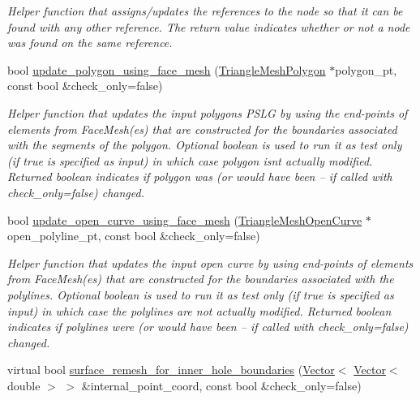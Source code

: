 \begin{DoxyCompactItemize}
\begin{DoxyCompactList}\small\item\em Helper function that assigns/updates the references to the node so that it can be found with any other reference. The return value indicates whether or not a node was found on the same reference. \end{DoxyCompactList}\item 
bool \hyperlink{classoomph_1_1RefineableTriangleMesh_ae089d459099bb928ced9b8a306b99df5}{update\+\_\+polygon\+\_\+using\+\_\+face\+\_\+mesh} (\hyperlink{classoomph_1_1TriangleMeshPolygon}{Triangle\+Mesh\+Polygon} $\ast$polygon\+\_\+pt, const bool \&check\+\_\+only=false)
\begin{DoxyCompactList}\small\item\em Helper function that updates the input polygon\textquotesingle{}s P\+S\+LG by using the end-\/points of elements from Face\+Mesh(es) that are constructed for the boundaries associated with the segments of the polygon. Optional boolean is used to run it as test only (if true is specified as input) in which case polygon isn\textquotesingle{}t actually modified. Returned boolean indicates if polygon was (or would have been -- if called with check\+\_\+only=false) changed. \end{DoxyCompactList}\item 
bool \hyperlink{classoomph_1_1RefineableTriangleMesh_ab8fb7db201e871f082afe3170ddb812f}{update\+\_\+open\+\_\+curve\+\_\+using\+\_\+face\+\_\+mesh} (\hyperlink{classoomph_1_1TriangleMeshOpenCurve}{Triangle\+Mesh\+Open\+Curve} $\ast$open\+\_\+polyline\+\_\+pt, const bool \&check\+\_\+only=false)
\begin{DoxyCompactList}\small\item\em Helper function that updates the input open curve by using end-\/points of elements from Face\+Mesh(es) that are constructed for the boundaries associated with the polylines. Optional boolean is used to run it as test only (if true is specified as input) in which case the polylines are not actually modified. Returned boolean indicates if polylines were (or would have been -- if called with check\+\_\+only=false) changed. \end{DoxyCompactList}\item 
virtual bool \hyperlink{classoomph_1_1RefineableTriangleMesh_a7189d208a062fda132f6fa814e4385cf}{surface\+\_\+remesh\+\_\+for\+\_\+inner\+\_\+hole\+\_\+boundaries} (\hyperlink{classoomph_1_1Vector}{Vector}$<$ \hyperlink{classoomph_1_1Vector}{Vector}$<$ double $>$ $>$ \&internal\+\_\+point\+\_\+coord, const bool \&check\+\_\+only=false)

\end{DoxyCompactItemize}
